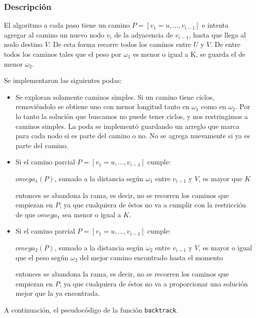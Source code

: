 \subsubsection{Descripción}

El algoritmo a cada paso tiene un camino $P = [v_1 = u, \dots, v_{i-1}]$ e intenta agregar al camino un nuevo nodo $v_i$ de la adyacencia de $v_{i-1}$, hasta que llega al nodo destino $V$. De esta forma recorre todos los caminos entre $U$ y $V$. De entre todos los caminos tales que el peso por $\omega_1$ es menor o igual a K, se guarda el de menor $\omega_2$.

Se implementaron las siguientes podas:

\begin{itemize}
    \item Se exploran solamente caminos simples. Si un camino tiene ciclos, removiéndolo se obtiene uno con menor longitud tanto en $\omega_1$ como en $\omega_2$. Por lo tanto la solución que buscamos no puede tener ciclos, y nos restringimos a caminos simples. La poda se implementó guardando un arreglo que marca para cada nodo si es parte del camino o no. No se agrega nuevamente si ya es parte del camino.
    \item Si el camino parcial $P = [v_1 = u, \dots, v_{i-1}]$ cumple:

        $omega_1(P)$, sumado a la distancia según $\omega_1$ entre $v_{i-1}$ y $V$, es mayor que $K$

entonces se abandona la rama, es decir, no se recorren los caminos que empiezan en $P$, ya que cualquiera de éstos no va a cumplir con la restricción de que $omega_1$ sea menor o igual a $K$.
    \item Si el camino parcial $P = [v_1 = u, \dots, v_{i-1}]$ cumple:

        $omega_2(P)$, sumado a la distancia según $\omega_2$ entre $v_{i-1}$ y $V$, es mayor o igual que el peso según $\omega_2$ del mejor camino encontrado hasta el momento

entonces se abandona la rama, es decir, no se recorren los caminos que empiezan en $P$, ya que cualquiera de éstos no va a proporcionar una solución mejor que la ya encontrada.
\end{itemize}

A continuaci\'on, el pseudoc\'odigo de la funci\'on \texttt{backtrack}.

